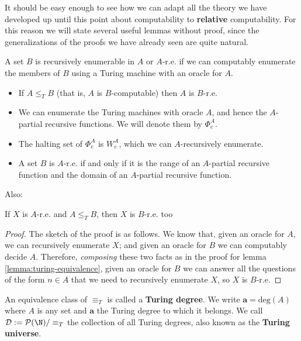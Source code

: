 \documentclass[../main.tex]{memoir}
\begin{document}
It should be easy enough to see how we can adapt all the theory we have developed up until this point about computability to \textbf{relative} computability. For this reason we will state several useful lemmas without proof, since the generalizations of the proofs we have already seen are quite natural.

\begin{definition}
  A set $B$ is recursively enumerable in $A$ or $A$-r.e. if we can computably enumerate the members of $B$ using a Turing machine with an oracle for $A$.
\end{definition}

\begin{lemma}
  \label{lemma:relative-computability-properties}
  \begin{itemize}
  \item If $A \le_T B$ (that is, $A$ is $B$-computable) then $A$ is $B$-r.e.
  \item We can enumerate the Turing machines with oracle $A$, and hence the $A$-partial recursive functions. We will denote them by $\Phi_e^A$.
  \item The halting set of $\Phi_e^A$ is $W_e^A$, which we can $A$-recursively enumerate.
  \item A set $B$ is $A$-r.e. if and only if it is the range of an $A$-partial recursive function and the domain of an $A$-partial recursive function.
  \end{itemize}
\end{lemma}

Also:

\begin{lemma}
  \label{lemma:re-monotonicity}
  If $X$ is $A$-r.e. and $A \le_T B$, then $X$ is $B$-r.e. too
\end{lemma}
\begin{proof}
  The sketch of the proof is as follows. We know that, given an oracle for $A$, we can recursively enumerate $X$; and given an oracle for $B$ we can computably decide $A$. Therefore, \textit{composing} these two facts as in the proof for lemma \ref{lemma:turing-equivalence}, given an oracle for $B$ we can answer all the questions of the form $n \in A$ that we need to recursively enumerate $X$, so $X$ is $B$-r.e.
\end{proof}

\begin{definition}
  \label{def:turing-degree}
  An equivalence class of $\equiv_T$ is called a \textbf{Turing degree}. We write $\mathbf{a} = \text{deg}(A)$ where $A$ is any set and $\mathbf{a}$ the Turing degree to which it belongs. We call $\mathbf{\mathcal{D}} := \mathcal{P}(\N) / \equiv_T$ the collection of all Turing degrees, also known as the \textbf{Turing universe}.
\end{definition}
\end{document}

